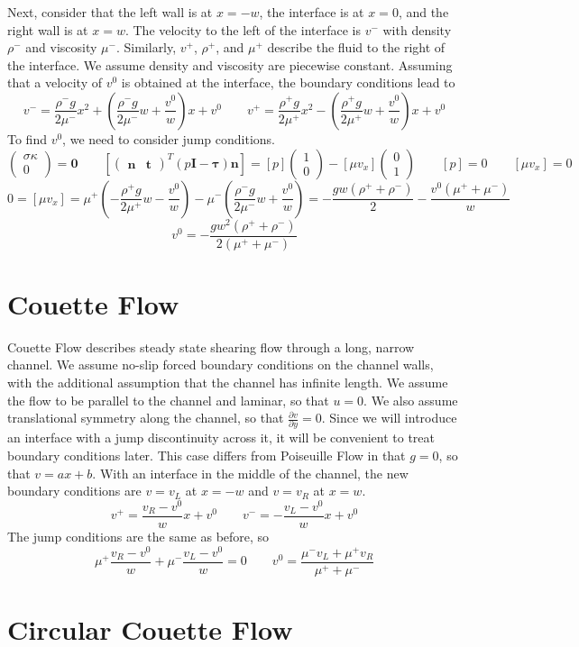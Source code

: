 \documentclass{article}
\newcommand{\q}{\quad\quad}
\newcommand{\gp}[1]{{\left({#1}\right)}}
\newcommand{\z}{\mathbf{0}}
\newcommand{\II}{\mathbf{I}}
\newcommand{\nn}{\mathbf{n}}
\renewcommand{\tt}{\mathbf{t}}
\newcommand{\ta}{\pmb{\tau}}
\newcommand{\mx}[1]{\begin{pmatrix} #1 \end{pmatrix}}
\newcommand{\px}[2]{\frac{\partial #1}{\partial #2}}
\begin{document}
Next, consider that the left wall is at $x = -w$, the interface is at $x = 0$, and the right wall is at $x = w$.  The velocity to the left of the interface is $v^-$ with density $\rho^-$
and viscosity $\mu^-$.  Similarly, $v^+$, $\rho^+$, and $\mu^+$ describe the fluid to the right of the interface.  We assume density and viscosity are piecewise constant.  Assuming that
a velocity of $v^0$ is obtained at the interface, the boundary conditions lead to
$$ v^- = \frac{\rho^- g}{2 \mu^-} x^2 + \gp{\frac{\rho^- g}{2 \mu^-} w + \frac{v^0}{w}} x + v^0 \q v^+ = \frac{\rho^+ g}{2 \mu^+} x^2 - \gp{\frac{\rho^+ g}{2 \mu^+} w + \frac{v^0}{w}} x
+ v^0 $$
To find $v^0$, we need to consider jump conditions.
$$ \mx{\sigma \kappa \\ 0} = \z \q \left[ \mx{\nn & \tt}^T (p \II - \ta) \nn \right] = [p] \mx{1 \\ 0}  - [\mu v_x] \mx{0 \\ 1} \q [p] = 0 \q [\mu v_x] = 0 $$
$$ 0 = [\mu v_x] = \mu^+ \gp{-\frac{\rho^+ g}{2 \mu^+} w - \frac{v^0}{w}} - \mu^- \gp{\frac{\rho^- g}{2 \mu^-} w + \frac{v^0}{w}} = 
-\frac{g w (\rho^+ + \rho^-)}{2} - \frac{v^0 (\mu^+ + \mu^-)}{w} $$
$$ v^0  = -\frac{g w^2 (\rho^+ + \rho^-)}{2 (\mu^+ + \mu^-)} $$

\section{Couette Flow}

Couette Flow describes steady state shearing flow through a long, narrow channel.  We assume no-slip forced boundary conditions on the channel walls, with the additional assumption that
the channel has infinite length. We assume the flow to be parallel to the channel and laminar, so that $u = 0$.  We also assume translational symmetry along the channel, so that
$\px{v}{y}=0$.  Since we will introduce an interface with a jump discontinuity across it, it will be convenient to treat boundary conditions later.  This case differs from Poiseuille
Flow in that $g = 0$, so that $v = a x + b$.  With an interface in the middle of the channel, the new boundary conditions are $v = v_L$ at $x = -w$ and $v=v_R$ at $x = w$.
$$ v^+ = \frac{v_R - v^0}{w} x + v^0 \q v^- = -\frac{v_L - v^0}{w} x + v^0 $$
The jump conditions are the same as before, so
$$ \mu^+ \frac{v_R - v^0}{w} + \mu^- \frac{v_L - v^0}{w} = 0 \q v^0 = \frac{\mu^- v_L + \mu^+ v_R}{\mu^+ + \mu^-} $$

\section{Circular Couette Flow}
\end{document}
